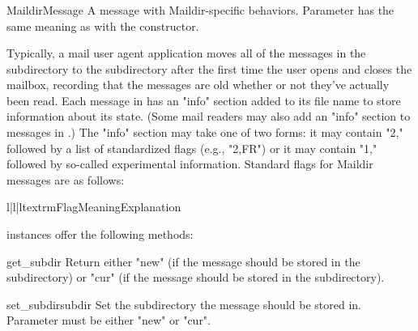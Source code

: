 \subsubsection{}
\label{mailbox-maildirmessage}

\begin{classdesc}{MaildirMessage}{}
A message with Maildir-specific behaviors. Parameter 
has the same meaning as with the  constructor.
\end{classdesc}

Typically, a mail user agent application moves all of the messages in the
 subdirectory to the  subdirectory after the first time the
user opens and closes the mailbox, recording that the messages are old whether
or not they've actually been read. Each message in  has an "info"
section added to its file name to store information about its state. (Some mail
readers may also add an "info" section to messages in .) The "info"
section may take one of two forms: it may contain "2," followed by a list of
standardized flags (e.g., "2,FR") or it may contain "1," followed by so-called
experimental information. Standard flags for Maildir messages are as follows:

\begin{tableiii}{l|l|l}{textrm}{Flag}{Meaning}{Explanation}
\end{tableiii}

 instances offer the following methods:

\begin{methoddesc}{get_subdir}{}
Return either "new" (if the message should be stored in the 
subdirectory) or "cur" (if the message should be stored in the 
subdirectory). 
\end{methoddesc}

\begin{methoddesc}{set_subdir}{subdir}
Set the subdirectory the message should be stored in. Parameter 
must be either "new" or "cur".
\end{methoddesc}


